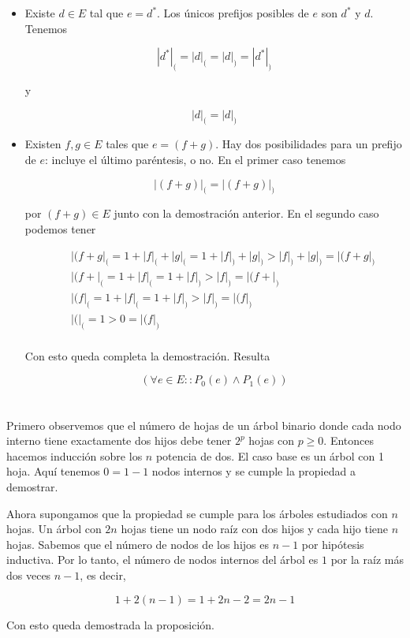 \documentclass{article}
\begin{document}
\begin{itemize}

\item Existe $d \in E$ tal que $e = d^*$. Los únicos prefijos posibles de $e$
son $d^*$ y $d$. Tenemos

$$|d^*|_( = |d|_( = |d|_) = |d^*|_)$$

y

$$|d|_( = |d|_)$$

\item Existen $f,g \in E$ tales que $e = (f+g)$. Hay dos posibilidades para un
prefijo de $e$: incluye el último paréntesis, o no. En el primer caso tenemos

$$
|(f+g)|_( = |(f+g)|_)
$$

por $(f+g) \in E$ junto con la demostración anterior. En el segundo caso podemos
tener

\begin{eqnarray*}
& & |(f+g|_( = 1 + |f|_( + |g|_( = 1 + |f|_) + |g|_) > |f|_) + |g|_) = |(f+g|_) \\
& & |(f+|_( = 1 + |f|_( = 1 + |f|_) > |f|_) = |(f+|_) \\
& & |(f|_( = 1 + |f|_( = 1 + |f|_) > |f|_) = |(f|_) \\
& & |(|_( = 1 > 0 = |(f|_) \\
\end{eqnarray*}

Con esto queda completa la demostración. Resulta

$$(\forall e \in E :: P_0(e) \wedge P_1(e))$$

\end{itemize}

\section{}

Primero observemos que el número de hojas de un árbol binario donde cada nodo
interno tiene exactamente dos hijos debe tener $2^p$ hojas con $p \geq 0$.
Entonces hacemos inducción sobre los $n$ potencia de dos. El caso base es un
árbol con 1 hoja. Aquí tenemos $0 = 1 - 1$ nodos internos y se cumple la
propiedad a demostrar.

Ahora supongamos que la propiedad se cumple para los
árboles estudiados con $n$ hojas. Un árbol con $2n$ hojas tiene un nodo raíz
con dos hijos y cada hijo tiene $n$ hojas. Sabemos que el número de nodos de los
hijos es $n-1$ por hipótesis inductiva. Por lo tanto, el número de
nodos internos del árbol es $1$ por la raíz más dos veces $n-1$, es decir,

$$
1+2(n-1) = 1 + 2n - 2 = 2n - 1
$$

Con esto queda demostrada la proposición.
\end{document}
